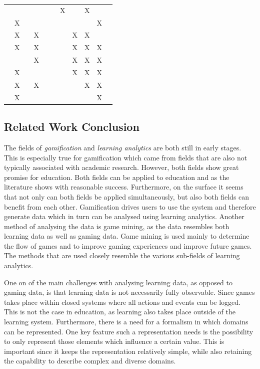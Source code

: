 \documentclass[11pt]{article}
\begin{document}
\begin{tabular}{l|lllllll|lll}
\cite{Modritscher2011}  &   &   &   &   &   & X &   & X &   &   \\ %
\cite{Mazza2004}        & X &   &   &   &   &   &   &   & X &   \\
\cite{Shum2012}         & X &   & X &   &   &   & X & X &   &   \\
\cite{Ullmann2011}      & X &   & X &   &   &   & X & X & X &   \\
\cite{Haiming2012}      &   &   & X &   &   &   & X & X & X &   \\
\cite{Fournier2011}     & X &   &   &   &   &   & X & X & X &   \\
\cite{Ferguson2012b}    & X &   & X &   &   &   &   & X & X &   \\ %
\cite{Blikstein2011}    & X &   &   &   &   &   &   &   & X &   \\ 
\end{tabular}

\subsection{Related Work Conclusion}
The fields of \emph{gamification} and \emph{learning analytics} are both still in early stages. This is especially true for gamification which came from fields that are also not typically associated with academic research. However, both fields show great promise for education. Both fields can be applied to education and as the literature shows with reasonable success. Furthermore, on the surface it seems that not only can both fields be applied simultaneously, but also both fields can benefit from each other. Gamification drives users to use the system and therefore generate data which in turn can be analysed using learning analytics. Another method of analysing the data is game mining, as the data resembles both learning data as well as gaming data. Game mining is used mainly to determine the flow of games and to improve gaming experiences and improve future games. The methods that are used closely resemble the various sub-fields of learning analytics. 

One on of the main challenges with analysing learning data, as opposed to gaming data, is that learning data is not necessarily fully observable. Since games takes place within closed systems where all actions and events can be logged. This is not the case in education, as learning also takes place outside of the learning system. Furthermore, there is a need for a formalism in which domains can be represented. One key feature such a representation needs is the possibility to only represent those elements which influence a certain value. This is important since it keeps the representation relatively simple, while also retaining the capability to describe complex and diverse domains. 
\end{document}
